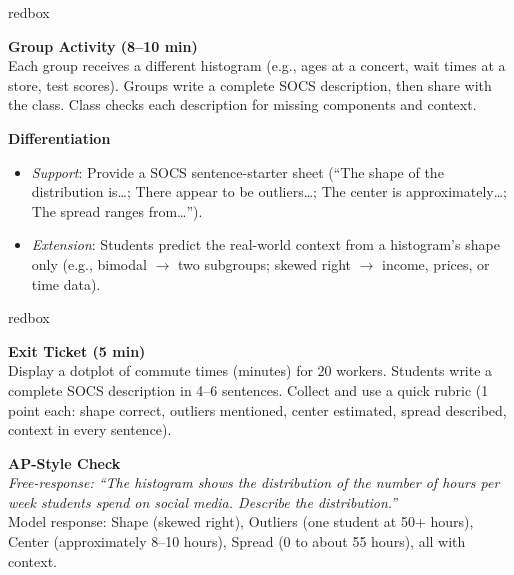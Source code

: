 \documentclass[10pt]{article}
\begin{document}
\begin{skillbox}{redbox}
\begin{minipage}[t]{0.48\linewidth}
    \textbf{Group Activity (8--10 min)}\\
    Each group receives a different histogram (e.g., ages at a concert, wait times at a store, test scores). Groups write a complete SOCS description, then share with the class. Class checks each description for missing components and context.
\end{minipage}
\hfill
\begin{minipage}[t]{0.48\linewidth}
    \textbf{Differentiation}
    \begin{itemize}
        \item \textit{Support}: Provide a SOCS sentence-starter sheet (``The shape of the distribution is\ldots; There appear to be outliers\ldots; The center is approximately\ldots; The spread ranges from\ldots'').
        \item \textit{Extension}: Students predict the real-world context from a histogram's shape only (e.g., bimodal $\to$ two subgroups; skewed right $\to$ income, prices, or time data).
    \end{itemize}
\end{minipage}
\end{skillbox}

\begin{skillbox}{redbox}
\begin{minipage}[t]{0.48\linewidth}
    \textbf{Exit Ticket (5 min)}\\
    Display a dotplot of commute times (minutes) for 20 workers. Students write a complete SOCS description in 4--6 sentences. Collect and use a quick rubric (1 point each: shape correct, outliers mentioned, center estimated, spread described, context in every sentence).
\end{minipage}
\hfill
\begin{minipage}[t]{0.48\linewidth}
    \textbf{AP-Style Check}\\
    \textit{Free-response: ``The histogram shows the distribution of the number of hours per week students spend on social media. Describe the distribution.''}\\[4pt]
    Model response: Shape (skewed right), Outliers (one student at 50+ hours), Center (approximately 8--10 hours), Spread (0 to about 55 hours), all with context.
\end{minipage}
\end{skillbox}
\end{document}
